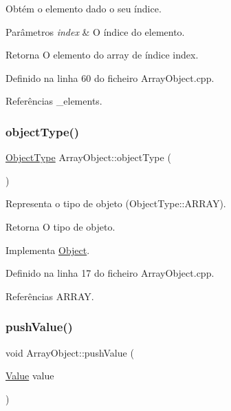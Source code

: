 Obtém o elemento dado o seu índice. 


\begin{DoxyParams}{Parâmetros}
{\em index} & O índice do elemento. \\
\hline
\end{DoxyParams}
\begin{DoxyReturn}{Retorna}
O elemento do array de índice index. 
\end{DoxyReturn}


Definido na linha 60 do ficheiro Array\+Object.\+cpp.



Referências \+\_\+elements.

\mbox{\label{classArrayObject_a63034d166dcd6caad9261c86c338a417}} 
\subsubsection{\texorpdfstring{object\+Type()}{objectType()}}
{\footnotesize\ttfamily \hyperlink{BasicTypes_8h_a842c5e2e69277690b064bf363c017980}{Object\+Type} Array\+Object\+::object\+Type (\begin{DoxyParamCaption}{ }\end{DoxyParamCaption})\hspace{0.3cm}{\ttfamily [virtual]}}



Representa o tipo de objeto (Object\+Type\+::\+A\+R\+R\+AY). 

\begin{DoxyReturn}{Retorna}
O tipo de objeto. 
\end{DoxyReturn}


Implementa \hyperlink{classObject_a08cee945bc224fc81f4448086625183d}{Object}.



Definido na linha 17 do ficheiro Array\+Object.\+cpp.



Referências A\+R\+R\+AY.

\mbox{\label{classArrayObject_a3f6f6445f0598bace2e29b338838333f}} 
\subsubsection{\texorpdfstring{push\+Value()}{pushValue()}}
{\footnotesize\ttfamily void Array\+Object\+::push\+Value (\begin{DoxyParamCaption}\item[{\hyperlink{structValue}{Value}}]{value }\end{DoxyParamCaption})}



